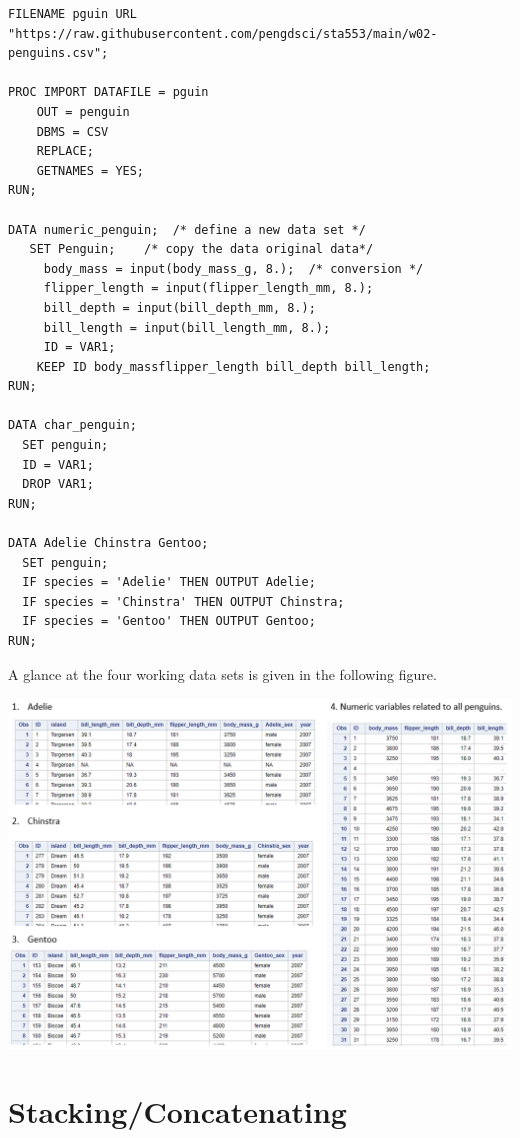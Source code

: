 \documentclass[
]{book}
\begin{document}
\begin{verbatim}
FILENAME pguin URL "https://raw.githubusercontent.com/pengdsci/sta553/main/w02-penguins.csv";

PROC IMPORT DATAFILE = pguin
    OUT = penguin        
    DBMS = CSV  
    REPLACE;
    GETNAMES = YES;
RUN;

DATA numeric_penguin;  /* define a new data set */
   SET Penguin;    /* copy the data original data*/
     body_mass = input(body_mass_g, 8.);  /* conversion */
     flipper_length = input(flipper_length_mm, 8.);
     bill_depth = input(bill_depth_mm, 8.);
     bill_length = input(bill_length_mm, 8.);
     ID = VAR1;
    KEEP ID body_massflipper_length bill_depth bill_length;
RUN;

DATA char_penguin;
  SET penguin;
  ID = VAR1;
  DROP VAR1;
RUN;

DATA Adelie Chinstra Gentoo;
  SET penguin;
  IF species = 'Adelie' THEN OUTPUT Adelie;
  IF species = 'Chinstra' THEN OUTPUT Chinstra;
  IF species = 'Gentoo' THEN OUTPUT Gentoo;
RUN;
\end{verbatim}

A glance at the four working data sets is given in the following figure.

\begin{center}\includegraphics[width=1\linewidth]{img08/w08-workingDataSet} \end{center}

\hypertarget{stackingconcatenating}{%
\section{Stacking/Concatenating}\label{stackingconcatenating}}
\end{document}
